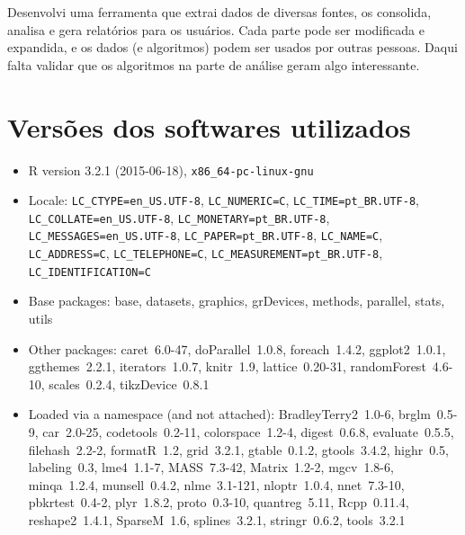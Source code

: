 \documentclass[a4paper,titlepage]{ppgi}\usepackage[]{graphicx}\usepackage[]{color}
\begin{document}
Desenvolvi uma ferramenta que extrai dados de diversas fontes, os consolida, analisa e gera relatórios para os usuários. Cada parte pode ser modificada e expandida, e os dados (e algoritmos) podem ser usados por outras pessoas. Daqui falta validar que os algoritmos na parte de análise geram algo interessante.







\appendix


\chapter{Versões dos softwares utilizados}

\begin{itemize}\raggedright
  \item R version 3.2.1 (2015-06-18), \verb|x86_64-pc-linux-gnu|
  \item Locale: \verb|LC_CTYPE=en_US.UTF-8|, \verb|LC_NUMERIC=C|, \verb|LC_TIME=pt_BR.UTF-8|, \verb|LC_COLLATE=en_US.UTF-8|, \verb|LC_MONETARY=pt_BR.UTF-8|, \verb|LC_MESSAGES=en_US.UTF-8|, \verb|LC_PAPER=pt_BR.UTF-8|, \verb|LC_NAME=C|, \verb|LC_ADDRESS=C|, \verb|LC_TELEPHONE=C|, \verb|LC_MEASUREMENT=pt_BR.UTF-8|, \verb|LC_IDENTIFICATION=C|
  \item Base packages: base, datasets, graphics, grDevices,
    methods, parallel, stats, utils
  \item Other packages: caret~6.0-47, doParallel~1.0.8,
    foreach~1.4.2, ggplot2~1.0.1, ggthemes~2.2.1, iterators~1.0.7,
    knitr~1.9, lattice~0.20-31, randomForest~4.6-10, scales~0.2.4,
    tikzDevice~0.8.1
  \item Loaded via a namespace (and not attached):
    BradleyTerry2~1.0-6, brglm~0.5-9, car~2.0-25,
    codetools~0.2-11, colorspace~1.2-4, digest~0.6.8,
    evaluate~0.5.5, filehash~2.2-2, formatR~1.2, grid~3.2.1,
    gtable~0.1.2, gtools~3.4.2, highr~0.5, labeling~0.3,
    lme4~1.1-7, MASS~7.3-42, Matrix~1.2-2, mgcv~1.8-6,
    minqa~1.2.4, munsell~0.4.2, nlme~3.1-121, nloptr~1.0.4,
    nnet~7.3-10, pbkrtest~0.4-2, plyr~1.8.2, proto~0.3-10,
    quantreg~5.11, Rcpp~0.11.4, reshape2~1.4.1, SparseM~1.6,
    splines~3.2.1, stringr~0.6.2, tools~3.2.1
\end{itemize}


%
%
%
\end{document}
